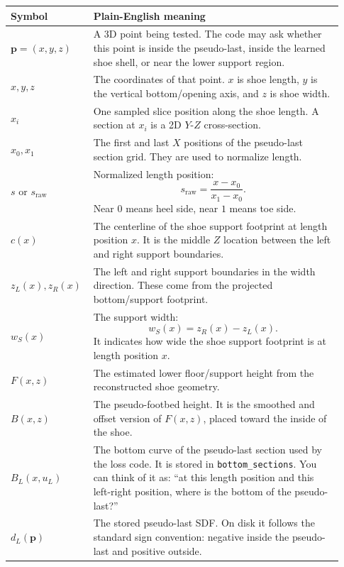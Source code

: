 \documentclass[11pt]{article}
\newcommand{\pt}{\mathbf{p}}
\begin{document}
\begin{longtable}{p{0.20\linewidth}p{0.73\linewidth}}
\toprule
\textbf{Symbol} & \textbf{Plain-English meaning} \\
\midrule
\endhead
\(\pt=(x,y,z)\) &
A 3D point being tested.  The code may ask whether this point is inside
the pseudo-last, inside the learned shoe shell, or near the lower support
region. \\
\midrule
\(x,y,z\) &
The coordinates of that point.  \(x\) is shoe length, \(y\) is the vertical
bottom/opening axis, and \(z\) is shoe width. \\
\midrule
\(x_i\) &
One sampled slice position along the shoe length.  A section at \(x_i\) is a
2D \(Y\)-\(Z\) cross-section. \\
\midrule
\(x_0,x_1\) &
The first and last \(X\) positions of the pseudo-last section grid.  They are
used to normalize length. \\
\midrule
\(s\) or \(s_{\mathrm{raw}}\) &
Normalized length position:
\[
s_{\mathrm{raw}}=\frac{x-x_0}{x_1-x_0}.
\]
Near \(0\) means heel side, near \(1\) means toe side. \\
\midrule
\(c(x)\) &
The centerline of the shoe support footprint at length position \(x\).  It is
the middle \(Z\) location between the left and right support boundaries. \\
\midrule
\(z_L(x),z_R(x)\) &
The left and right support boundaries in the width direction.  These come from
the projected bottom/support footprint. \\
\midrule
\(w_S(x)\) &
The support width:
\[
w_S(x)=z_R(x)-z_L(x).
\]
It indicates how wide the shoe support footprint is at length position \(x\). \\
\midrule
\(F(x,z)\) &
The estimated lower floor/support height from the reconstructed shoe geometry. \\
\midrule
\(B(x,z)\) &
The pseudo-footbed height.  It is the smoothed and offset version of
\(F(x,z)\), placed toward the inside of the shoe. \\
\midrule
\(B_L(x,u_L)\) &
The bottom curve of the pseudo-last section used by the loss code.  It is
stored in \texttt{bottom\_sections}.  You can think of it as: ``at this length
position and this left-right position, where is the bottom of the pseudo-last?'' \\
\midrule
\(d_L(\pt)\) &
The stored pseudo-last SDF.  On disk it follows the standard sign convention:
negative inside the pseudo-last and positive outside. \\
\midrule

\end{longtable}
\end{document}
